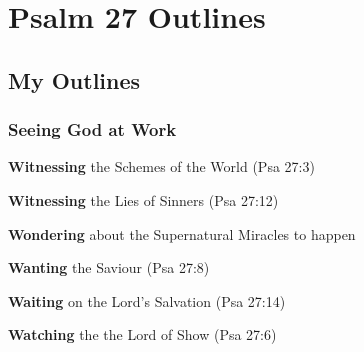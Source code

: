 \section{Psalm 27 Outlines}

\subsection{My Outlines}

\subsubsection{Seeing God at Work}

\begin{compactenum}[I.]
    \item \textbf{Witnessing} the Schemes of the World (Psa 27:3)
    \item \textbf{Witnessing} the Lies of Sinners (Psa 27:12)
    \item \textbf{Wondering} about the Supernatural Miracles to happen 
    \item \textbf{Wanting} the Saviour (Psa 27:8)
    \item \textbf{Waiting} on the Lord's Salvation (Psa 27:14)
    \item \textbf{Watching} the the Lord of Show (Psa 27:6)
\end{compactenum}
